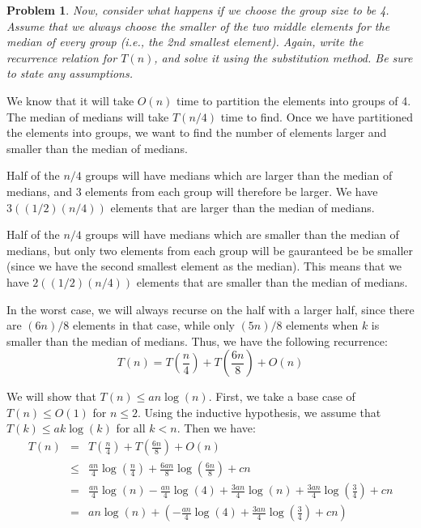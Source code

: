 \documentclass[psamsfonts]{amsart}
\newtheorem{prob}{Problem}[section]
\newenvironment{sol}{{\bfseries Solution}}{\qedsymbol}
\theoremstyle{definition}
\theoremstyle{remark}
\numberwithin{equation}{section}
\begin{document}
\begin{prob}
Now, consider what happens if we choose the group size to be 4. Assume that we
always choose the smaller of the two middle elements for the median of every group
(i.e., the 2nd smallest element). Again, write the recurrence relation for $T(n)$, and
solve it using the substitution method. Be sure to state any assumptions.
\end{prob}

\begin{sol}
We know that it will take $O(n)$ time to partition the elements into groups of 4. The median of medians will take $T(n/4)$ time to find. Once we have partitioned the elements into groups, we want to find the number of elements larger and smaller than the median of medians.

Half of the $n/4$ groups will have medians which are larger than the median of medians, and 3 elements from each group will therefore be larger. We have $3 ( (1/2)(n/4))$ elements that are larger than the median of medians.

Half of the $n/4$ groups will have medians which are smaller than the median of medians, but only two elements from each group will be gauranteed be be smaller (since we have the second smallest element as the median). This means that we have $2((1/2)(n/4))$ elements that are smaller than the median of medians.

In the worst case, we will always recurse on the half with a larger half, since there are $(6n)/8$ elements in that case, while only $(5n)/8$ elements when $k$ is smaller than the median of medians. Thus, we have the following recurrence:
\begin{equation}
T(n) = T \left( \frac{n}{4} \right) + T \left( \frac{6n}{8}\right) + O(n)
\end{equation}

We will show that $T(n) \leq a n \log(n)$. First, we take a base case of $T(n) \leq O(1)$ for $n \leq 2$. Using the inductive hypothesis, we assume that $T(k) \leq a k \log(k)$ for all $k < n$. Then we have:
\begin{eqnarray}
T(n) &=& T \left(\frac{n}{4} \right) + T \left( \frac{6n}{8} \right) + O(n) \\
 &\leq& \frac{an}{4} \log \left( \frac{n}{4} \right) + \frac{6an}{8} \log \left( \frac{6n}{8} \right) + c n \\
&=& \frac{an}{4} \log (n) - \frac{an}{4} \log(4) + \frac{3an}{4} \log(n) + \frac{3an}{4} \log \left( \frac{3}{4} \right) + cn \\
&=& an \log(n) + \left( -\frac{an}{4} \log (4) + \frac{3an}{4} \log \left( \frac{3}{4} \right) + cn \right)
\end{eqnarray}


\end{sol}
\end{document}
